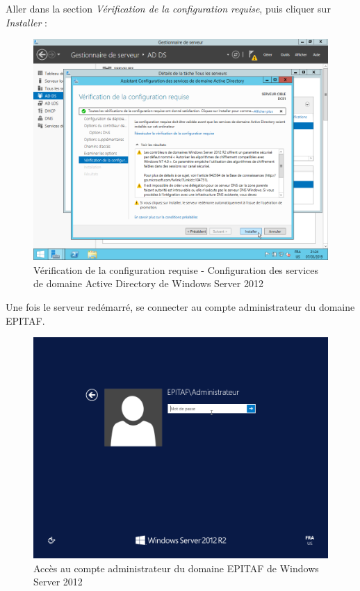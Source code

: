 \newpage
Aller dans la section \textit{Vérification de la configuration requise}, puis cliquer sur \textit{Installer} :
\begin{figure}[h!]
    \begin{center}
        \includegraphics[scale=0.6]{WS2012_Screenshots/64.png}
        \caption{Vérification de la configuration requise - Configuration des services de domaine Active Directory de Windows Server 2012}
        \label{WS2012_Screenshots/64}
    \end{center}
\end{figure}
\FloatBarrier

\newpage
Une fois le serveur redémarré, se connecter au compte administrateur du domaine EPITAF.
\begin{figure}[h!]
    \begin{center}
        \includegraphics[scale=0.6]{WS2012_Screenshots/65.png}
        \caption{Accès au compte administrateur du domaine EPITAF de Windows Server 2012}
        \label{WS2012_Screenshots/65}
    \end{center}
\end{figure}
\FloatBarrier

